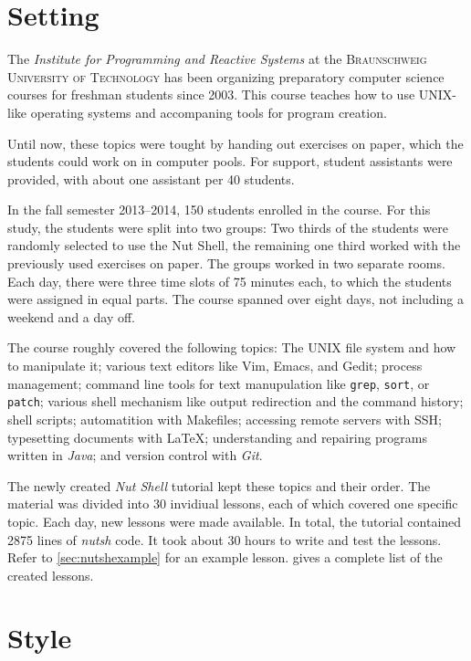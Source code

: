 \documentclass[paper=a4,twoside,abstract=on,cleardoublepage=empty,numbers=noenddot,toc=bib,toc=listof,12pt,appendixprefix=true]{scrreprt}
\begin{document}
\section{Setting}

The \textit{Institute for Programming and Reactive Systems} at the \textsc{Braunschweig University of Technology} has been organizing preparatory computer science courses for freshman students since 2003. This course teaches how to use UNIX-like operating systems and accompaning tools for program creation.

Until now, these topics were tought by handing out exercises on paper, which the students could work on in computer pools. For support, student assistants were provided, with about one assistant per 40 students.

In the fall semester 2013--2014, 150 students enrolled in the course. For this study, the students were split into two groups: Two thirds of the students were randomly selected to use the Nut Shell, the remaining one third worked with the previously used exercises on paper. The groups worked in two separate rooms. Each day, there were three time slots of 75 minutes each, to which the students were assigned in equal parts. The course spanned over eight days, not including a weekend and a day off.

The course roughly covered the following topics: The \textsc{UNIX} file system and how to manipulate it; various text editors like Vim, Emacs, and Gedit; process management; command line tools for text manupulation like \texttt{grep}, \texttt{sort}, or \texttt{patch}; various shell mechanism like output redirection and the command history; shell scripts; automatition with Makefiles; accessing remote servers with \textsc{SSH}; typesetting documents with \LaTeX; understanding and repairing programs written in \textit{Java}; and version control with \textit{Git}.

The newly created \textit{Nut Shell} tutorial kept these topics and their order. The material was divided into 30 invidiual lessons, each of which covered one specific topic. Each day, new lessons were made available. In total, the tutorial contained 2875 lines of \textit{nutsh} code. It took about 30 hours to write and test the lessons. Refer to \cref{sec:nutshexample} for an example lesson.  gives a complete list of the created lessons.

\section{Style}
\end{document}
